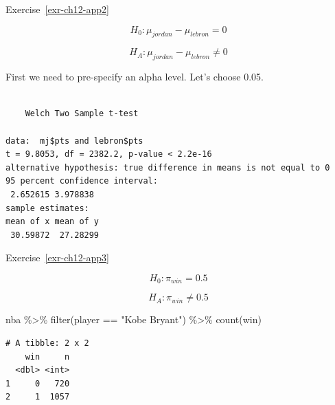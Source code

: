\documentclass[
  letterpaper,
  DIV=11,
  numbers=noendperiod]{scrreprt}
\newenvironment{Shaded}{\begin{snugshade}}{\end{snugshade}}
\newcommand{\AttributeTok}[1]{\textcolor[rgb]{0.40,0.45,0.13}{#1}}
\newcommand{\FunctionTok}[1]{\textcolor[rgb]{0.28,0.35,0.67}{#1}}
\newcommand{\NormalTok}[1]{\textcolor[rgb]{0.00,0.23,0.31}{#1}}
\newcommand{\OtherTok}[1]{\textcolor[rgb]{0.00,0.23,0.31}{#1}}
\newcommand{\SpecialCharTok}[1]{\textcolor[rgb]{0.37,0.37,0.37}{#1}}
\newcommand{\StringTok}[1]{\textcolor[rgb]{0.13,0.47,0.30}{#1}}
\theoremstyle{definition}
\theoremstyle{remark}
\begin{document}
Exercise~\ref{exr-ch12-app2}

\[H_0: \mu_{jordan} - \mu_{lebron} = 0\]

\[H_A: \mu_{jordan} - \mu_{lebron} \ne 0\]

First we need to pre-specify an alpha level. Let's choose 0.05.

\begin{Shaded}
\end{Shaded}

\begin{verbatim}

    Welch Two Sample t-test

data:  mj$pts and lebron$pts
t = 9.8053, df = 2382.2, p-value < 2.2e-16
alternative hypothesis: true difference in means is not equal to 0
95 percent confidence interval:
 2.652615 3.978838
sample estimates:
mean of x mean of y 
 30.59872  27.28299 
\end{verbatim}

Exercise~\ref{exr-ch12-app3}

\[H_0: \pi_{win} = 0.5\]

\[H_A: \pi_{win} \ne 0.5\]

\begin{Shaded}
\begin{Highlighting}[]
\NormalTok{nba }\SpecialCharTok{\%\textgreater{}\%} 
  \FunctionTok{filter}\NormalTok{(player }\SpecialCharTok{==} \StringTok{"Kobe Bryant"}\NormalTok{) }\SpecialCharTok{\%\textgreater{}\%} 
  \FunctionTok{count}\NormalTok{(win)}
\end{Highlighting}
\end{Shaded}

\begin{verbatim}
# A tibble: 2 x 2
    win     n
  <dbl> <int>
1     0   720
2     1  1057
\end{verbatim}
\end{document}
